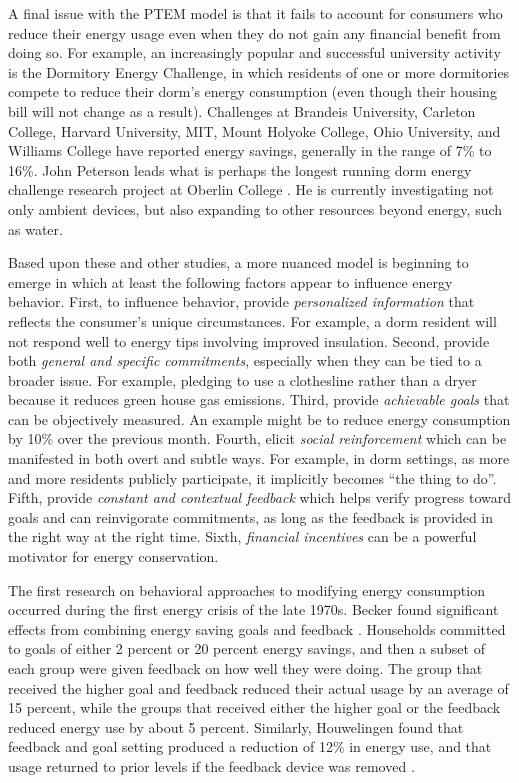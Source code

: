 A final issue with the PTEM model is that it fails to account for consumers who
reduce their energy usage even when they do not gain any financial benefit
from doing so.  For example, an increasingly popular and successful
university activity is the Dormitory Energy Challenge, in which residents
of one or more dormitories compete to reduce their dorm's energy
consumption (even though their housing bill will not change as a result).
Challenges at Brandeis University, Carleton College, Harvard University,
MIT, Mount Holyoke College, Ohio University, and Williams College have
reported energy savings, generally in the range of 7\% to 16\%.  John
Peterson leads what is perhaps the longest running dorm energy challenge
research project at Oberlin College \cite{Peterson07,Peterson07a}.  He is
currently investigating not only ambient devices, but also expanding to
other resources beyond energy, such as water.

Based upon these and other studies, a more nuanced model is beginning to
emerge in which at least the following factors appear to influence energy
behavior.  First, to influence behavior, provide {\em personalized
  information} that reflects the consumer's unique circumstances.  For
example, a dorm resident will not respond well to energy tips involving
improved insulation.  Second, provide both {\em general and specific
  commitments}, especially when they can be tied to a broader issue. For
example, pledging to use a clothesline rather than a dryer because it
reduces green house gas emissions.  Third, provide {\em achievable goals}
that can be objectively measured.  An example might be to reduce energy
consumption by 10\% over the previous month.  Fourth, elicit {\em social
  reinforcement} which can be manifested in both overt and subtle ways.  For
example, in dorm settings, as more and more residents publicly
participate, it implicitly becomes ``the thing to do''.  Fifth, provide
{\em constant and contextual feedback} which helps verify progress toward
goals and can reinvigorate commitments, as long as the feedback is provided
in the right way at the right time.  Sixth, {\em financial incentives} can
be a powerful motivator for energy conservation. 

The first research on behavioral approaches to modifying energy consumption
occurred during the first energy crisis of the late 1970s. Becker found
significant effects from combining energy saving goals and feedback
\cite{Becker78} .  Households committed to goals of either 2 percent or 20
percent energy savings, and then a subset of each group were given feedback
on how well they were doing. The group that received the higher goal and
feedback reduced their actual usage by an average of 15 percent, while the
groups that received either the higher goal or the feedback reduced energy
use by about 5 percent.  Similarly, Houwelingen found that feedback and
goal setting produced a reduction of 12\% in energy use, and that usage
returned to prior levels if the feedback device was removed
\cite{Houwelingen89}.

